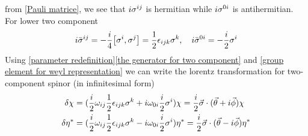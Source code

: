 from \eqref{Pauli matrice}, we see that $i\sigma^{ij}$ is hermitian while $i\sigma^{0i}$ is antihermitian. For lower two component
\begin{equation}
i\bar{\s}^{ij} = -\frac{i}{4}\comm{\s^{i}}{\s^{j}} = \half\e_{ijk} \s^k ,\quad
i\bar{\s}^{0i} = -\frac{i}{2}\s^{i}
\end{equation}
Using  \eqref{parameter redefinition}\eqref{the generator for  two component} and \eqref{group element for weyl representation}
we can write the lorentz transformation for two-component spinor (in infinitesimal form) 
\begin{align}\label{infinitesimal transformation for two component spinor}
\delta\chi &= (\frac{i}{2} \omega_{ij}\frac{1}{2}\epsilon_{ijk}\sigma^k 
          +i \omega_{0i}\frac{i}{2}\sigma^{i})\chi
        = \frac{i}{2}\vec{\sigma}\cdot(\vec{\theta}+i\vec{\phi})\chi\notag\\
\delta\eta^* &= (\frac{i}{2} \omega_{ij}\frac{1}{2}\epsilon_{ijk}\sigma^k 
-i \omega_{0i}\frac{i}{2}\sigma^{i})\eta^*
= \frac{i}{2}\vec{\sigma}\cdot(\vec{\theta}-i\vec{\phi})\eta^*
\end{align}

